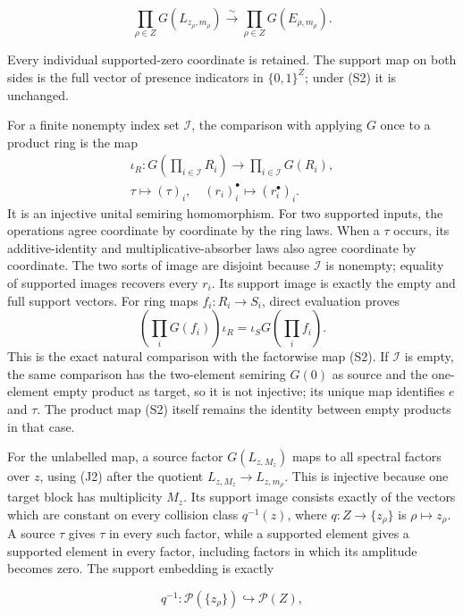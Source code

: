 \[
\prod_{\rho\in Z}G(L_{z_\rho,m_\rho})
\xrightarrow{\sim}
\prod_{\rho\in Z}G(E_{\rho,m_\rho}).
\tag{S2}
\]

Every individual supported-zero coordinate is retained. The support map on both sides is the full vector of presence indicators in \(\{0,1\}^Z\); under (S2) it is unchanged.

For a finite nonempty index set \(\mathcal I\), the comparison with
applying \(G\) once to a product ring is the map
\[
 \begin{gathered}
 \iota_R:G\left(\prod_{i\in\mathcal I}R_i\right)
       \longrightarrow\prod_{i\in\mathcal I}G(R_i),\\
 \tau\longmapsto(\tau)_i,\quad
 (r_i)_i^\bullet\longmapsto(r_i^\bullet)_i.
 \end{gathered}
 \tag{S4}
\]
It is an injective unital semiring homomorphism. For two supported
inputs, the operations agree coordinate by coordinate by the ring
laws. When a \(\tau\) occurs, its additive-identity and
multiplicative-absorber laws also agree coordinate by coordinate.
The two sorts of image are disjoint because \(\mathcal I\) is
nonempty; equality of supported images recovers every \(r_i\).
Its support image is exactly the empty and full support vectors.
For ring maps \(f_i:R_i\to S_i\), direct evaluation proves
\[
 \left(\prod_iG(f_i)\right)\iota_R
       =\iota_S G\left(\prod_i f_i\right).
 \tag{S5}
\]
This is the exact natural comparison with the factorwise map (S2).
If \(\mathcal I\) is empty, the same comparison has the two-element
semiring \(G(0)\) as source and the one-element empty product as
target, so it is not injective; its unique map identifies \(e\)
and \(\tau\). The product map (S2) itself remains the identity
between empty products in that case.

For the unlabelled map, a source factor \(G(L_{z,M_z})\) maps to all spectral factors over \(z\), using (J2) after the quotient \(L_{z,M_z}\longrightarrow L_{z,m_\rho }\). This is injective because one target block has multiplicity \(M_z\). Its support image consists exactly of the vectors which are constant on every collision class \(q^{-1}(z)\), where \(q:Z\longrightarrow\{z_\rho\}\) is \(\rho \longmapsto z_\rho\). A source \(\tau\) gives \(\tau\) in every such factor, while a supported element gives a supported element in every factor, including factors in which its amplitude becomes zero. The support embedding is exactly

\[
q^{-1}:\mathcal P(\{z_\rho\})\hookrightarrow\mathcal P(Z),
\tag{S3}
\]

